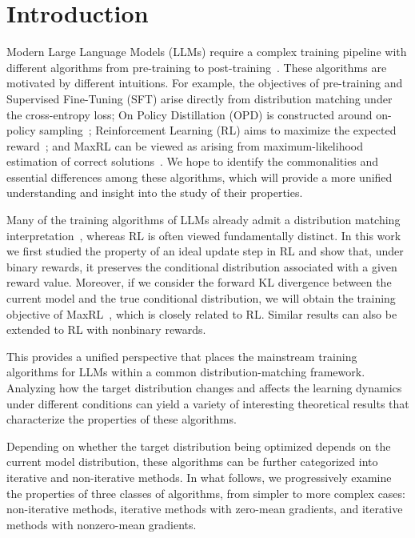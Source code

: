 \section{Introduction}

Modern Large Language Models (LLMs) require a complex training pipeline with different algorithms from pre-training to post-training~\citep{team_kimi_2026, deepseek-ai_deepseek-v4_2026, glm-5-team_glm-5_2026}. These algorithms are motivated by different intuitions. For example, the objectives of pre-training and Supervised Fine-Tuning (SFT) arise directly from distribution matching under the cross-entropy loss; On Policy Distillation (OPD) is constructed around on-policy sampling~\citep{lochab_uniform-correct_2026}; Reinforcement Learning (RL) aims to maximize the expected reward~\citep{williams_simple_1992}; and MaxRL can be viewed as arising from maximum-likelihood estimation of correct solutions~\citep{tajwar_maximum_2026}. We hope to identify the commonalities and essential differences among these algorithms, which will provide a more unified understanding and insight into the study of their properties.

Many of the training algorithms of LLMs already admit a distribution matching interpretation~\citep{korbak_reinforcement_2022, khalifa_distributional_2021}, whereas RL is often viewed fundamentally distinct. In this work we first studied the property of an ideal update step in RL and show that, under binary rewards, it preserves the conditional distribution associated with a given reward value. Moreover, if we consider the forward KL divergence between the current model and the true conditional distribution, we will obtain the training objective of MaxRL~\citep{tajwar_maximum_2026}, which is closely related to RL. Similar results can also be extended to RL with nonbinary rewards.

This provides a unified perspective that places the mainstream training algorithms for LLMs within a common distribution-matching framework. Analyzing how the target distribution changes and affects the learning dynamics under different conditions can yield a variety of interesting theoretical results that characterize the properties of these algorithms.

Depending on whether the target distribution being optimized depends on the current model distribution, these algorithms can be further categorized into iterative and non-iterative methods. In what follows, we progressively examine the properties of three classes of algorithms, from simpler to more complex cases: non-iterative methods, iterative methods with zero-mean gradients, and iterative methods with nonzero-mean gradients.

